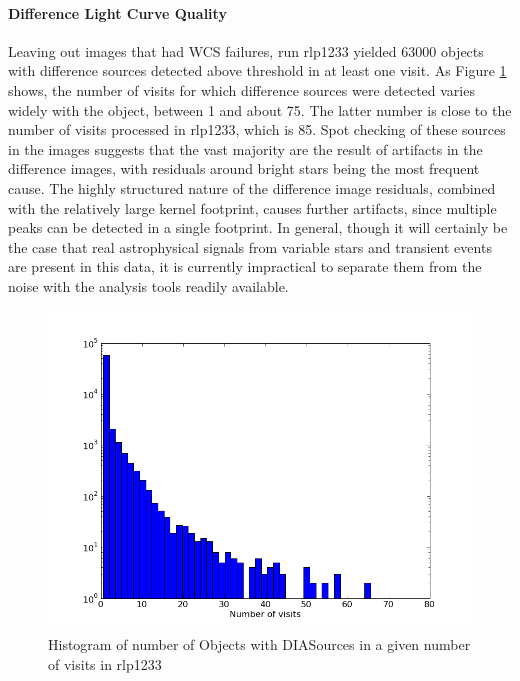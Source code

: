 \paragraph{Difference Light Curve Quality}
Leaving out images that had WCS failures, run rlp1233 yielded 63000
objects with difference sources detected above threshold in at least
one visit. As Figure \ref{fig:lightcurve1} shows, the number of visits
for which difference sources were detected varies widely with the object, between 1 and
about 75.  The latter number is close to the number of visits
processed in rlp1233, which is 85.  Spot checking of these sources in
the images suggests that the vast majority are the result of artifacts
in the difference images, with residuals around bright stars being the
most frequent cause.  The highly structured nature of the difference
image residuals, combined with the relatively large kernel footprint,
causes further artifacts, since multiple peaks can be detected in a
single footprint.  In general, though it will certainly be the case
that real astrophysical signals from variable stars and transient
events are present in this data, it is currently impractical to
separate them from the noise with the analysis tools readily
available.

\begin{figure}[htb]
\begin{center}
\includegraphics[width=6in]{images/rlp1233DiffLCHisto.png}
\caption{Histogram of number of Objects with DIASources in a given number of
  visits in rlp1233}  
\label{fig:lightcurve1}
\end{center}
\end{figure}

